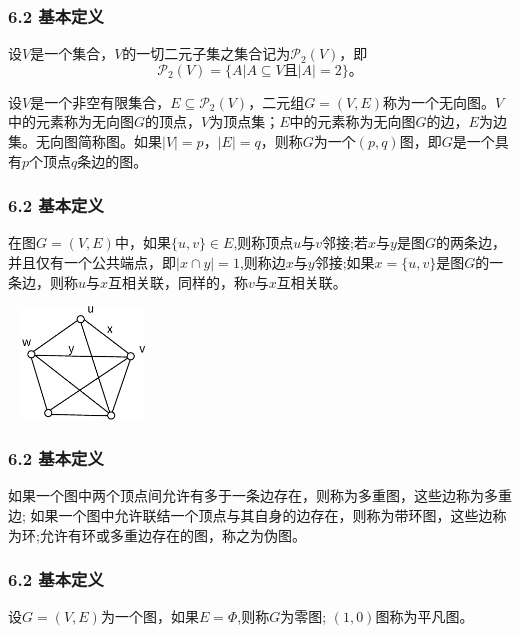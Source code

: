 \documentclass{beamer}
\begin{document}
\begin{CJK}{UTF8}{gbsn}
\begin{frame}
  \frametitle{6.2 基本定义}
设$V$是一个集合，$V$的一切二元子集之集合记为$\mathcal{P}_2(V)$，即
\begin{equation*}
  \mathcal{P}_2(V) = \{A|A \subseteq V \text{且} |A| = 2\}\text{。}
\end{equation*}
\begin{definition6.2.1}
  设$V$是一个非空有限集合，$E \subseteq \mathcal{P}_2(V)$，二元组$G = (V, E)$称为一个\alert{无向图}。$V$中的元素称为无向图$G$的\alert{顶点}，$V$为\alert{顶点集}；$E$中的元素称为无向图$G$的\alert{边}，$E$为\alert{边集}。无向图简称\alert{图}。如果$|V|=p$，$|E|=q$，则称$G$为一个$(p,q)$图，即$G$是一个具有$p$个顶点$q$条边的图。
\end{definition6.2.1}

\end{frame}


\begin{frame}
  \frametitle{6.2 基本定义}
  \begin{definition6.2.2}
    在图$G=(V,E)$中，如果$\{u,v\}\in E$,则称\alert{顶点$u$与$v$邻接};若$x$与$y$是图$G$的两条边，并且仅有一个公共端点，即$|x \cap y|= 1$,则称\alert{边$x$与$y$邻接};如果$x=\{u,v\}$是图$G$的一条边，则称\alert{$u$与$x$互相关联}，同样的，称\alert{$v$与$x$互相关联}。
  \end{definition6.2.2}
\centering
    \includegraphics[width=4cm,height=3cm]{graph}
\end{frame}

\begin{frame}
  \frametitle{6.2 基本定义}
  \begin{definition6.2.3}
   如果一个图中两个顶点间允许有多于一条边存在，则称为\alert{多重图}，这些边称为\alert{多重边}; 如果一个图中允许联结一个顶点与其自身的边存在，则称为\alert{带环图}，这些边称为\alert{环};允许有环或多重边存在的图，称之为\alert{伪图}。
  \end{definition6.2.3}
\end{frame}


\begin{frame}
  \frametitle{6.2 基本定义}
  \begin{definition6.2.4}
设$G=(V,E)$为一个图，如果$E=\Phi$,则称$G$为\alert{零图}; $(1,0)$图称为\alert{平凡图}。    
  \end{definition6.2.4}
\end{frame}




\end{CJK}
\end{document}
